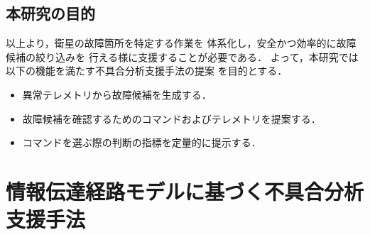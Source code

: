 \documentclass[11pt]{jsarticle}%
\begin{document}
\begin{multicols}{2}
\subsection{本研究の目的}
\vspace{-1zh}
以上より，衛星の故障箇所を特定する作業を
体系化し，安全かつ効率的に故障候補の絞り込みを
行える様に支援することが必要である．
よって，本研究では以下の機能を満たす不具合分析支援手法の提案
を目的とする．
  \begin{itemize}
  \item 異常テレメトリから故障候補を生成する．
  \item 故障候補を確認するためのコマンドおよびテレメトリを提案する．
  \item コマンドを選ぶ際の判断の指標を定量的に提示する．
\end{itemize}
\vspace{-1zh}
\section{情報伝達経路モデルに基づく不具合分析支援手法}
\vspace{-1zh}

\end{multicols}
\end{document}
